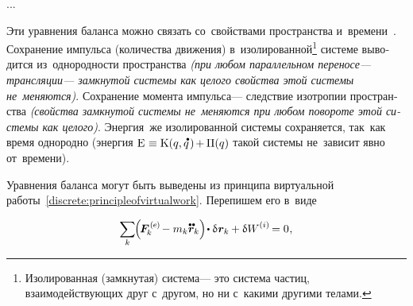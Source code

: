 \begin{otherlanguage}{russian}
...




Эти уравнения баланса можно связать со~свойствами пространства и~времени~\cite{landau.lifshitz-shortcourse}. Сохранение импульса (количества движения) в~изолированной\footnote{Изолированная (замкнутая) система\:--- это система частиц, взаимодействующих друг с~другом, но ни с~какими другими телами.}\hspace{-0.25ex} системе выводится из~однородности пространства \emph{(при любом параллельном переносе\:--- трансляции\:--- замкнутой системы как целого свойства этой системы не~меняются)}.
Сохранение момента импульса\:--- следствие изотропии пространства \emph{(свойства замкнутой системы не~меняются при любом повороте этой системы как целого)}.
Энергия~же изолированной системы сохраняется, так~как время однородно (энергия ${\mathrm{E} \hspace{.1ex} \equiv \kinetic \hspace{.1ex} (q, \mathdotabove{q} \hspace{.2ex}) \hspace{-0.2ex} + \hspace{-0.1ex} \potential(q)}$ такой системы не~зависит явно от~времени).

Уравнения баланса могут быть выведены из принципа виртуальной работы~\eqref{discrete:principleofvirtualwork}.
Перепишем его в~виде

\nopagebreak\vspace{-0.2em}\begin{equation}\label{discrete:principleofvirtualwork.externalinternal}
\displaystyle \sum_{\smash{k}} \hspace{-0.2ex} \Bigl( \hspace{-0.25ex} \bm{F}^{\smthexternal}_{\hspace{-0.16ex}k} \hspace{-0.1ex} - m_k \mathdotdotabove{\locationvector}_k \Bigr) \hspace{-0.32ex} \dotp \variation{\hspace{.1ex}\locationvector_k} \hspace{-0.1ex}
+ \variation{\internalwork} \hspace{-0.1ex} = 0 \hspace{.1ex},
\vspace{-0.25em}\end{equation}


\end{otherlanguage}
